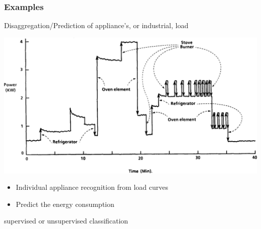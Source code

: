 \documentclass[compress, smaller, serif, 9pt]{beamer}
\newcommand{\structuretext}[1]{{\usebeamercolor[fg]{structure} #1}}
\newcommand{\doigt}{\structuretext{\noindent \Pisymbol{pzd}{43}}}
\begin{document}
\begin{frame}
  \frametitle{Examples}
\begin{block}{Disaggregation/Prediction of appliance's, or industrial, load}
\begin{center}
  \includegraphics[width=.7\textwidth]{ex_CDC.png}
\end{center}
\begin{itemize}
\vspace{-5mm}
\item[\doigt] Individual appliance recognition from load curves
\item[\doigt] Predict the energy consumption
\end{itemize}
\end{block}
\begin{center}
 \alert{supervised or unsupervised classification}
\end{center}

\end{frame}
\end{document}
